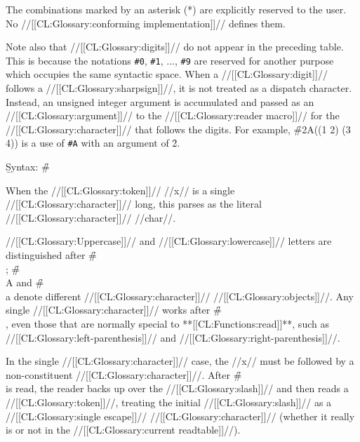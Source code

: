 The combinations marked by an asterisk (*) are explicitly reserved to the
user.  No //[[CL:Glossary:conforming implementation]]// defines them.

Note also that //[[CL:Glossary:digits]]// do not appear in the preceding table.  This is
because the notations {\tt \#0}, {\tt \#1}, ..., {\tt \#9} are
reserved for another purpose which occupies the same syntactic space.
When a //[[CL:Glossary:digit]]// follows a //[[CL:Glossary:sharpsign]]//,
it is not treated as a dispatch character.
Instead, an unsigned integer argument is accumulated 
and passed as an //[[CL:Glossary:argument]]// to the //[[CL:Glossary:reader macro]]// 
for the //[[CL:Glossary:character]]// that follows the digits.
For example,
\f{\#2A((1 2) (3 4))} is a use of {\tt \#A} with an argument of \f{2}.





\b{Syntax:} \f{\#\\}



When the //[[CL:Glossary:token]]// //x// is a single //[[CL:Glossary:character]]// long, 
this parses as the literal //[[CL:Glossary:character]]// //char//.

//[[CL:Glossary:Uppercase]]// and //[[CL:Glossary:lowercase]]// letters are distinguished after \f{\#\\};
\f{\#\\A} and \f{\#\\a} denote different //[[CL:Glossary:character]]// //[[CL:Glossary:objects]]//.
Any single //[[CL:Glossary:character]]// works after \f{\#\\},
even those that are normally special to **[[CL:Functions:read]]**, 
such as //[[CL:Glossary:left-parenthesis]]// and //[[CL:Glossary:right-parenthesis]]//.


In the single //[[CL:Glossary:character]]// case,
the //x// must be followed by a non-constituent //[[CL:Glossary:character]]//.
After \f{\#\\} is read,
the reader backs up over the //[[CL:Glossary:slash]]// and then reads a //[[CL:Glossary:token]]//,
treating the initial //[[CL:Glossary:slash]]// as a //[[CL:Glossary:single escape]]// //[[CL:Glossary:character]]//
(whether it really is or not in the //[[CL:Glossary:current readtable]]//).








